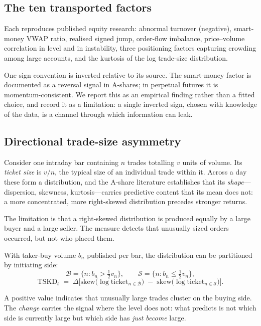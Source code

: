 \documentclass[11pt,letterpaper]{article}
\begin{document}
\subsection{The ten transported factors}

Each reproduces published equity research: abnormal turnover (negative),
smart-money VWAP ratio, realised signed jump, order-flow imbalance,
price--volume correlation in level and in instability, three positioning factors
capturing crowding among large accounts, and the kurtosis of the log trade-size
distribution.

One sign convention is inverted relative to its source. The smart-money factor
is documented as a reversal signal in A-shares; in perpetual futures it is
momentum-consistent. We report this as an empirical finding rather than a fitted
choice, and record it as a limitation: a single inverted sign, chosen with
knowledge of the data, is a channel through which information can leak.

\subsection{Directional trade-size asymmetry}

Consider one intraday bar containing $n$ trades totalling $v$ units of volume.
Its \emph{ticket size} is $v/n$, the typical size of an individual trade within
it. Across a day these form a distribution, and the A-share literature
establishes that its \emph{shape}---dispersion, skewness, kurtosis---carries
predictive content that its mean does not: a more concentrated, more
right-skewed distribution precedes stronger returns.

The limitation is that a right-skewed distribution is produced equally by a
large buyer and a large seller. The measure detects that unusually sized orders
occurred, but not who placed them.

With taker-buy volume $b_n$ published per bar, the distribution can be
partitioned by initiating side:
\[
\mathcal{B} = \{n : b_n > \tfrac{1}{2}v_n\}, \qquad
\mathcal{S} = \{n : b_n \le \tfrac{1}{2}v_n\},
\]
\[
\mathrm{TSKD}_t \;=\; \Delta\Big[\mathrm{skew}\big(\log \mathrm{ticket}_{n\in\mathcal{B}}\big)
\;-\; \mathrm{skew}\big(\log \mathrm{ticket}_{n\in\mathcal{S}}\big)\Big].
\]

A positive value indicates that unusually large trades cluster on the buying
side. The \emph{change} carries the signal where the level does not: what
predicts is not which side is currently large but which side has \emph{just
become} large.
\end{document}
